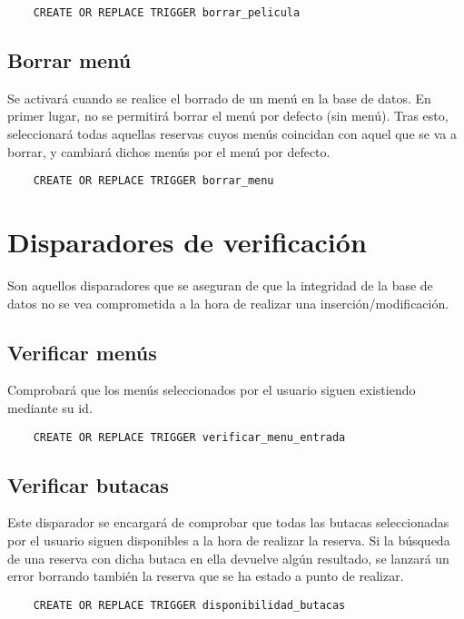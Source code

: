 \begin{verbatim}
    CREATE OR REPLACE TRIGGER borrar_pelicula
\end{verbatim}

\subsection{Borrar menú}
Se activará cuando se realice el borrado de un menú en la base de datos. En primer lugar, no se permitirá borrar el menú por defecto (sin menú). Tras esto, seleccionará todas aquellas reservas cuyos menús coincidan con aquel que se va a borrar, y cambiará dichos menús por el menú por defecto.

\begin{verbatim}
    CREATE OR REPLACE TRIGGER borrar_menu
\end{verbatim}

\section{Disparadores de verificación}
Son aquellos disparadores que se aseguran de que la integridad de la base de datos no se vea comprometida a la hora de realizar una inserción/modificación.

\subsection{Verificar menús}
Comprobará que los menús seleccionados por el usuario siguen existiendo mediante su id.

\begin{verbatim}
    CREATE OR REPLACE TRIGGER verificar_menu_entrada
\end{verbatim}

\subsection{Verificar butacas}
Este disparador se encargará de comprobar que todas las butacas seleccionadas por el usuario siguen disponibles a la hora de realizar la reserva. Si la búsqueda de una reserva con dicha butaca en ella devuelve algún resultado, se lanzará un error borrando también la reserva que se ha estado a punto de realizar.

\begin{verbatim}
    CREATE OR REPLACE TRIGGER disponibilidad_butacas
\end{verbatim}